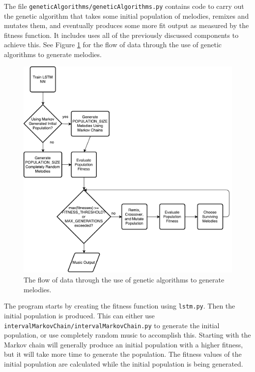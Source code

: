 The file \texttt{geneticAlgorithms/geneticAlgorithms.py} contains code to carry out the genetic algorithm that takes some initial population of melodies, remixes and mutates them, and eventually produces some more fit output as measured by the fitness function.
It includes uses all of the previously discussed components to achieve this.
See Figure \ref{fig:gaflowchart} for the flow of data through the use of genetic algorithms to generate melodies.

\begin{figure}[h!]
	\centering
	\includegraphics[width=\linewidth]{figures/genetic_algorithm_flowchart.pdf}
	\caption{The flow of data through the use of genetic algorithms to generate melodies.}
	\label{fig:gaflowchart}
\end{figure}

The program starts by creating the fitness function using \texttt{lstm.py}.
Then the initial population is produced.
This can either use \texttt{intervalMarkovChain/intervalMarkovChain.py} to generate the initial population, or use completely random music to accomplish this.
Starting with the Markov chain will generally produce an initial population with a higher fitness, but it will take more time to generate the population.
The fitness values of the initial population are calculated while the initial population is being generated.

